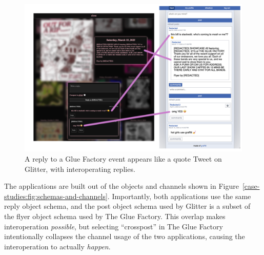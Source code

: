 \begin{figure}[h]
    \centering
    \includegraphics[width=\textwidth]{paper/figures/gloof-and-glitter.png}
    \caption{A reply to a Glue Factory event appears like a quote Tweet on Glitter, with
    interoperating replies.}

    \label{case-studies:fig:gloof-and-glitter}
\end{figure}

The applications are built out of the objects and channels
shown in Figure~\ref{case-studies:fig:schemas-and-channels}.
Importantly, both applications use the same reply object schema,
and the post object schema used by Glitter is a subset of the flyer
object schema used by The Glue Factory.
This overlap makes interoperation \emph{possible},
but selecting ``crosspost'' in The Glue Factory intentionally collapses the
channel usage of the two applications,
causing the interoperation to actually \emph{happen}.

